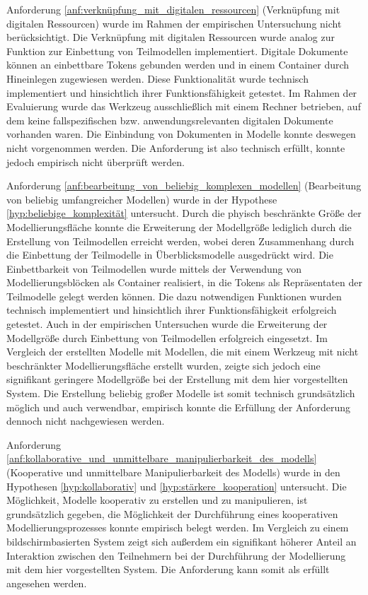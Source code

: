 Anforderung \ref{anf:verknüpfung_mit_digitalen_ressourcen} (Verknüpfung mit digitalen Ressourcen) wurde im Rahmen der empirischen Untersuchung nicht berücksichtigt. Die Verknüpfung mit digitalen Ressourcen wurde analog zur Funktion zur Einbettung von Teilmodellen implementiert. Digitale Dokumente können an einbettbare Tokens gebunden werden und in einem Container durch Hineinlegen zugewiesen werden. Diese Funktionalität wurde technisch implementiert und hinsichtlich ihrer Funktionsfähigkeit getestet. Im Rahmen der Evaluierung wurde das Werkzeug ausschließlich mit einem Rechner betrieben, auf dem keine fallspezifischen bzw. anwendungsrelevanten digitalen Dokumente vorhanden waren. Die Einbindung von Dokumenten in Modelle konnte deswegen nicht vorgenommen werden. Die Anforderung ist also technisch erfüllt, konnte jedoch empirisch nicht überprüft werden. 

Anforderung \ref{anf:bearbeitung_von_beliebig_komplexen_modellen} (Bearbeitung von beliebig umfangreicher Modellen) wurde in der Hypothese \ref{hyp:beliebige_komplexität} untersucht. Durch die phyisch beschränkte Größe der Modellierungsfläche konnte die Erweiterung der Modellgröße lediglich durch die Erstellung von Teilmodellen erreicht werden, wobei deren Zusammenhang durch die Einbettung der Teilmodelle in Überblicksmodelle ausgedrückt wird. Die Einbettbarkeit von Teilmodellen wurde mittels der Verwendung von Modellierungsblöcken als Container realisiert, in die Tokens als Repräsentaten der Teilmodelle gelegt werden können. Die dazu notwendigen Funktionen wurden technisch implementiert und hinsichtlich ihrer Funktionsfähigkeit erfolgreich getestet. Auch in der empirischen Untersuchen wurde die Erweiterung der Modellgröße durch Einbettung von Teilmodellen erfolgreich eingesetzt. Im Vergleich der erstellten Modelle mit Modellen, die mit einem Werkzeug mit nicht beschränkter Modellierungsfläche erstellt wurden, zeigte sich jedoch eine signifikant geringere Modellgröße bei der Erstellung mit dem hier vorgestellten System. Die Erstellung beliebig großer Modelle ist somit technisch grundsätzlich möglich und auch verwendbar, empirisch konnte die Erfüllung der Anforderung dennoch nicht nachgewiesen werden.

Anforderung \ref{anf:kollaborative_und_unmittelbare_manipulierbarkeit_des_modells} (Kooperative und unmittelbare Manipulierbarkeit des Modells) wurde in den Hypothesen \ref{hyp:kollaborativ} und \ref{hyp:stärkere_kooperation} untersucht. Die Möglichkeit, Modelle kooperativ zu erstellen und zu manipulieren, ist grundsätzlich gegeben, die Möglichkeit der Durchführung eines kooperativen Modellierungsprozesses konnte empirisch belegt werden. Im Vergleich zu einem bildschirmbasierten System zeigt sich außerdem ein signifikant höherer Anteil an Interaktion zwischen den Teilnehmern bei der Durchführung der Modellierung mit dem hier vorgestellten System. Die Anforderung kann somit als erfüllt angesehen werden.

